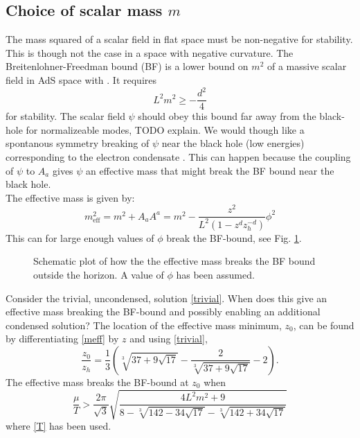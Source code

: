 \documentclass[12pt]{report}
\newcommand{\At}{\ensuremath{{\phi}}}
\begin{document}
\subsection{Choice of scalar mass $m$}
The mass squared of a scalar field in flat space must be non-negative for stability. This is though not the case in a space with negative curvature. The Breitenlohner-Freedman bound (BF) is a lower bound on $m^2$ of a massive scalar field in AdS space with . It requires
\begin{equation}
 L^2m^2\geq-\frac{d^2}{4}\label{BF}
\end{equation}
for stability\cite{Kleban:2004bv}. The scalar field $\psi$ should obey this bound far away from the black-hole for normalizeable modes, TODO explain. We would though like a spontanous symmetry breaking of $\psi$ near the black hole (low energies) corresponding to the electron condensate \cite{Gubser:2008px}. This can happen because the coupling of $\psi$ to $A_a$ gives $\psi$ an effective mass that might break the BF bound near the black hole. \\The effective mass is given by:
\begin{equation}
 m_{\mathrm{eff}}^2=m^2+A_aA^a
=m^2-\frac{z^2}{L^2(1-z^dz_h^{-d})}\At^2
\label{meff}
\end{equation}
This can for large enough values of $\At$ break the BF-bound, see Fig. \ref{BF}.
\begin{figure}
\centering

\caption{Schematic plot of how the the effective mass breaks the BF bound outside the horizon. A value of $\At$ has been assumed.\label{BF}}
\end{figure}
Consider the trivial, uncondensed, solution \eqref{trivial}. When does this give an effective mass breaking the BF-bound and possibly enabling an additional condensed solution? The location of the effective mass minimum, $z_0$, can be found by differentiating \eqref{meff} by $z$ and using \eqref{trivial},
\begin{equation}
\frac{z_0}{z_h}=\frac{1}{3} \left(\sqrt[3]{37+9 \sqrt{17}}-\frac{2}{\sqrt[3]{37+9 \sqrt{17}}}-2\right).
\end{equation}
The effective mass breaks the BF-bound at $z_0$ when
\begin{equation}
 \frac{\mu}{T}>
\frac{2\pi }{\sqrt{3}} \sqrt{\frac{4 L^2 m^2+9}{8-\sqrt[3]{142-34
   \sqrt{17}}-\sqrt[3]{142+34 \sqrt{17}}}}
\end{equation}
where \eqref{T} has been used.
\end{document}
